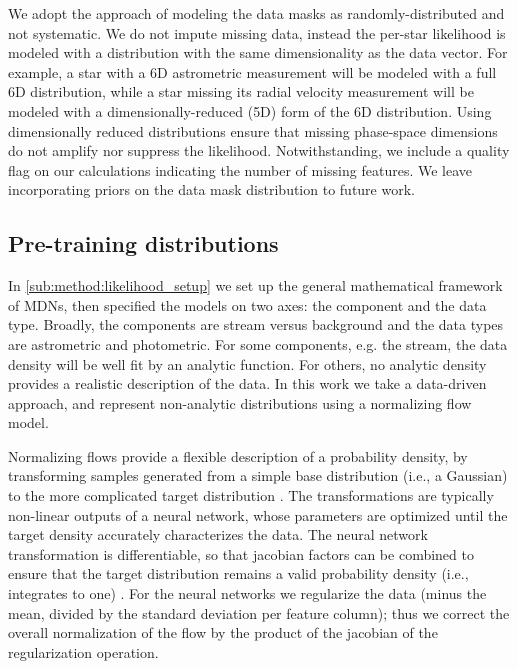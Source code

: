 \documentclass[twocolumn]{aastex631}
\begin{document}
        We adopt the approach of modeling the data masks as randomly-distributed
        and not systematic. We do not impute missing data, instead the per-star
        likelihood is modeled with a distribution with the same dimensionality
        as the data vector.  For example, a star with a 6D astrometric
        measurement will be modeled with a full 6D distribution, while a star
        missing its radial velocity measurement will be modeled with a
        dimensionally-reduced (5D) form of the 6D distribution. Using
        dimensionally reduced distributions ensure that missing phase-space
        dimensions do not amplify nor suppress the likelihood.  Notwithstanding,
        we include a quality flag on our calculations indicating the number of
        missing features.  We leave incorporating priors on the data mask
        distribution to future work. 


    \subsection{Pre-training distributions} 
    \label{sub:method:pre-training_distributions}

        In \autoref{sub:method:likelihood_setup} we set up the general
        mathematical framework of MDNs, then specified the models on two axes:
        the component and the data type. Broadly, the components are stream
        versus background and the data types are astrometric and photometric.
        For some components, e.g. the stream, the data density will be well fit
        by an analytic function.  For others, no analytic density provides a
        realistic description of the data. In this work we take a data-driven
        approach, and represent non-analytic distributions using a normalizing
        flow model.

        Normalizing flows provide a flexible description of a probability
        density, by transforming samples generated from a simple base
        distribution (i.e., a Gaussian) to the more complicated target
        distribution \citep{EstebanVanden2010, Rippel2013, RezendeMohamed2015}.
        The transformations are typically non-linear outputs of a neural
        network, whose parameters are optimized until the target density
        accurately characterizes the data. The neural network transformation is
        differentiable, so that jacobian factors can be combined to ensure that
        the target distribution remains a valid probability density (i.e.,
        integrates to one) \citep{Kobyzev+2019}.  For the neural networks we
        regularize the data (minus the mean, divided by the standard deviation
        per feature column); thus we correct the overall normalization of the
        flow by the product of the jacobian of the regularization operation.
\end{document}
